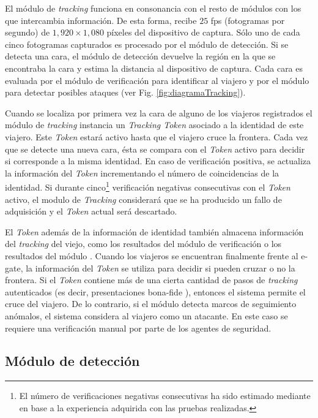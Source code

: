 El módulo de \textit{tracking} funciona en consonancia con el resto de módulos con los que intercambia información. De esta forma, recibe $25$ fps (fotogramas por segundo)  de $1,920\times1,080$ píxeles del dispositivo de captura. Sólo {uno de cada cinco fotogramas capturados es procesado} por el módulo de detección. Si se detecta una cara, el módulo de detección devuelve la región en la que se encontraba la cara y estima la distancia al dispositivo de captura. Cada cara es evaluada por el módulo de verificación para identificar al viajero y por el módulo  para detectar posibles ataques (ver Fig. \ref{fig:diagramaTracking}). 

Cuando se localiza por primera vez la cara de alguno de los viajeros registrados el módulo de \textit{tracking} instancia un \textit{Tracking Token} asociado a la identidad de este viajero. Este \textit{Token} estará activo hasta que el viajero cruce la frontera. Cada vez que se detecte una nueva cara, ésta se compara con el \textit{Token} activo para decidir si corresponde a la misma identidad. En caso de verificación positiva, se actualiza la información del \textit{Token} incrementando el número de coincidencias de la identidad. Si durante cinco\footnote{El número de verificaciones negativas consecutivas ha sido estimado mediante en base a la experiencia adquirida con las pruebas realizadas.} verificación negativas consecutivas con el \textit{Token} activo, el modulo de \textit{Tracking} considerará que se ha producido un fallo de adquisición y el \textit{Token} actual será descartado.

El \textit{Token} además de la información de identidad también almacena información del \textit{tracking} del viejo, como los resultados del módulo de verificación o los resultados del módulo . Cuando los viajeros se encuentran finalmente frente al \gls{e-gate}, la información del \textit{Token} se utiliza para decidir si pueden cruzar o no la frontera. Si el \textit{Token} contiene más de una cierta cantidad de pasos de \textit{tracking} autenticados (es decir, presentaciones \gls{bona-fide} \cite{ramachandra2017presentation}), entonces el sistema permite el cruce del viajero. De lo contrario, si el módulo  detecta marcos de seguimiento anómalos, el sistema considera al viajero como un atacante. En este caso se requiere una verificación manual por parte de los agentes de seguridad.

\subsection{Módulo de detección}

